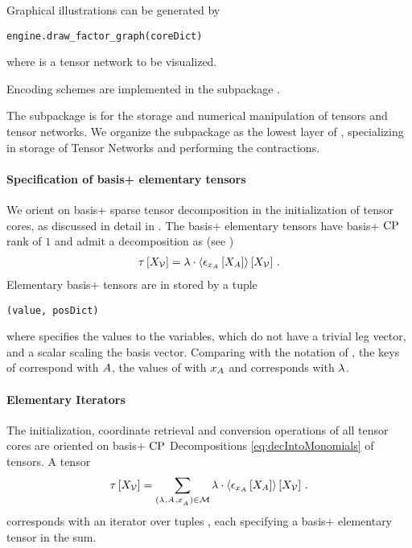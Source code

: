 Graphical illustrations can be generated by
\begin{lstlisting}
engine.draw_factor_graph(coreDict)
\end{lstlisting}
where  is a tensor network to be visualized.


\subsect{\bnencoding}
Encoding schemes are implemented in the subpackage \sprepresentation{}.



\label{sec:implementationEngine}

The \spengine{} subpackage is for the storage and numerical manipulation of tensors and tensor networks.
We organize the subpackage as the lowest layer of \tnreason{}, specializing in storage of Tensor Networks and performing the contractions.


\paragraph{Specification of basis+ elementary tensors}
We orient on basis+ sparse tensor decomposition in the initialization of tensor cores, as discussed in detail in .
The basis+ elementary tensors have basis+ $\mathrm{CP}$ rank of $1$ and admit a decomposition as (see )
\begin{align*}
    \tau\left[X_{\mathcal{V}}\right]
    = \lambda \cdot \left\langle \epsilon_{x_{A}}\left[X_{A}\right]\right\rangle \left[ X_{\mathcal{V}} \right] \, .
\end{align*}
Elementary basis+ tensors are in \tnreason{} stored by a tuple
\begin{lstlisting}
(value, posDict)
\end{lstlisting}
where  specifies the values to the variables, which do not have a trivial leg vector, and  a scalar scaling the basis vector.
Comparing with the notation of , the keys of  correspond with $A$, the values of  with $x_{A}$ and  corresponds with $\lambda$.

\paragraph{Elementary Iterators}
The initialization, coordinate retrieval and conversion operations of all tensor cores are oriented on basis+ $\mathrm{CP}$ Decompositions \eqref{eq:decIntoMonomials} of tensors.
A tensor
\begin{align*}
    \tau\left[X_{\mathcal{V}}\right]
    = \sum_{(\lambda^{}, A^{}, x_{A^{}}^{})\in\mathcal{M}} \lambda \cdot \left\langle \epsilon_{x_{A}}\left[X_{A}\right]\right\rangle \left[ X_{\mathcal{V}} \right] \, .
\end{align*}
corresponds with an iterator over tuples , each specifying a basis+ elementary tensor in the sum.

